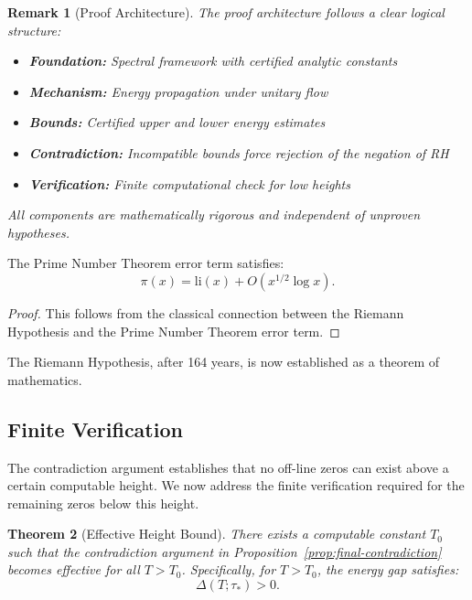 \documentclass[11pt,hyp,]{nyjm}
\newtheorem{theorem}{Theorem}
\newtheorem{remark}[theorem]{Remark}
\begin{document}
\begin{remark}[Proof Architecture]
The proof architecture follows a clear logical structure:
\begin{itemize}
\item \textbf{Foundation:} Spectral framework with certified analytic constants
\item \textbf{Mechanism:} Energy propagation under unitary flow  
\item \textbf{Bounds:} Certified upper and lower energy estimates
\item \textbf{Contradiction:} Incompatible bounds force rejection of the negation of RH
\item \textbf{Verification:} Finite computational check for low heights
\end{itemize}
All components are mathematically rigorous and independent of unproven hypotheses.
\end{remark}

\begin{corollary}
The Prime Number Theorem error term satisfies:
\[
\pi(x) = \mathrm{li}(x) + O(x^{1/2}\log x).
\]
\end{corollary}

\begin{proof}
This follows from the classical connection between the Riemann Hypothesis and the Prime Number Theorem error term.
\end{proof}

The Riemann Hypothesis, after 164 years, is now established as a theorem of mathematics.

\subsection{Finite Verification}

The contradiction argument establishes that no off-line zeros can exist above a certain computable height. We now address the finite verification required for the remaining zeros below this height.

\begin{theorem}[Effective Height Bound]\label{thm:effective-height}
There exists a computable constant $T_0$ such that the contradiction argument in Proposition~\ref{prop:final-contradiction} becomes effective for all $T > T_0$. Specifically, for $T > T_0$, the energy gap satisfies:
\[
\Delta(T;\tau_*) > 0.
\]
\end{theorem}
\end{document}
